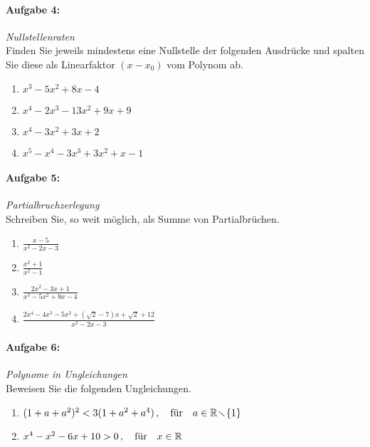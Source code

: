 \newpage
\paragraph{Aufgabe 4: } \emph{Nullstellenraten}\\[0.2cm]
Finden Sie jeweils mindestens eine Nullstelle der folgenden Ausdrücke und spalten Sie diese als Linearfaktor $(x-x_0)$ vom Polynom ab.
\begin{multicols}{2}
    \begin{enumerate}[label=(\alph*), labelindent=1em,labelsep=0.5cm]
        \item $x^3-5x^2+8x-4$
        \item $x^4-2x^3-13x^2+9x+9$
        \item $x^4-3x^2+3x+2$
        \item $x^5-x^4-3x^3+3x^2+x-1$
    \end{enumerate}
\end{multicols}
%
\paragraph{Aufgabe 5: } \emph{Partialbruchzerlegung}\\[0.2cm]
Schreiben Sie, so weit möglich, als Summe von Partialbrüchen.
\begin{multicols}{2}
    \begin{enumerate}[label=(\alph*)]
        \item $\frac{x-5}{x^2-2x-3}$
        \item $\frac{x^2+1}{x^2-1}$
        \item $\frac{2x^2-3x+1}{x^3-5x^2+8x-4}$
        \item $\frac{2x^4-4x^3-5x^2+(\sqrt{2}-7)x+\sqrt{2}+12}{x^2-2x-3}$
    \end{enumerate}
\end{multicols}
%
%
\paragraph{Aufgabe 6: } \emph{Polynome in Ungleichungen}\\[0.2cm]
Beweisen Sie die folgenden Ungleichungen.
\begin{enumerate}[label=(\alph*)]
    \item $(1+a+a^2)^2<3(1+a^2+a^4)\,,\qq{für} a\in\mathbb{R}\!\smallsetminus\!\{1\}$
    \item $x^4-x^2-6x+10>0\,,\qq{für} x\in\mathbb{R}$
\end{enumerate}